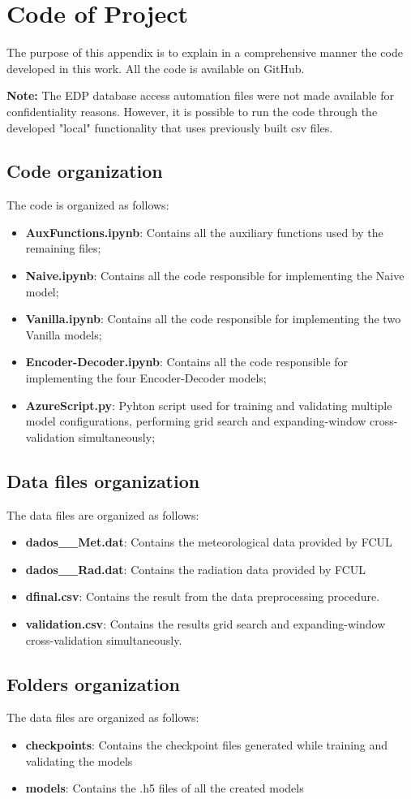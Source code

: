 \chapter{Code of Project}
\label{chapter:appendixA}


The purpose of this appendix is to explain in a comprehensive manner the code developed in this work. All the code is available on GitHub.

\textbf{Note:} The EDP database access automation files were not made available for confidentiality reasons. However, it is possible to run the code through the developed "local" functionality that uses previously built csv files.

\section{Code organization}
The code is organized as follows:
\begin{itemize}
    \item \textbf{AuxFunctions.ipynb}: Contains all the auxiliary functions used by the remaining files;
    \item \textbf{Naive.ipynb}: Contains all the code responsible for implementing the Naive model;
    \item \textbf{Vanilla.ipynb}: Contains all the code responsible for implementing the two Vanilla models;
    \item \textbf{Encoder-Decoder.ipynb}: Contains all the code responsible for implementing the four Encoder-Decoder models;
    \item \textbf{AzureScript.py}: Pyhton script used for training and validating multiple model configurations, performing grid search and expanding-window cross-validation simultaneously;
\end{itemize}

\section{Data files organization}
The data files are organized as follows:
\begin{itemize}
    \item \textbf{dados\_\_Met.dat}: Contains the meteorological data provided by \ac{FCUL}
    \item \textbf{dados\_\_Rad.dat}: Contains the radiation data provided by \ac{FCUL}
    \item \textbf{dfinal.csv}: Contains the result from the data preprocessing procedure. 
    \item \textbf{validation.csv}: Contains the results grid search and expanding-window cross-validation simultaneously. 
\end{itemize}

\section{Folders organization}
The data files are organized as follows:
\begin{itemize}
    \item \textbf{checkpoints}: Contains the checkpoint files generated while training and validating the models
    \item \textbf{models}: Contains the .h5 files of all the created models
\end{itemize}